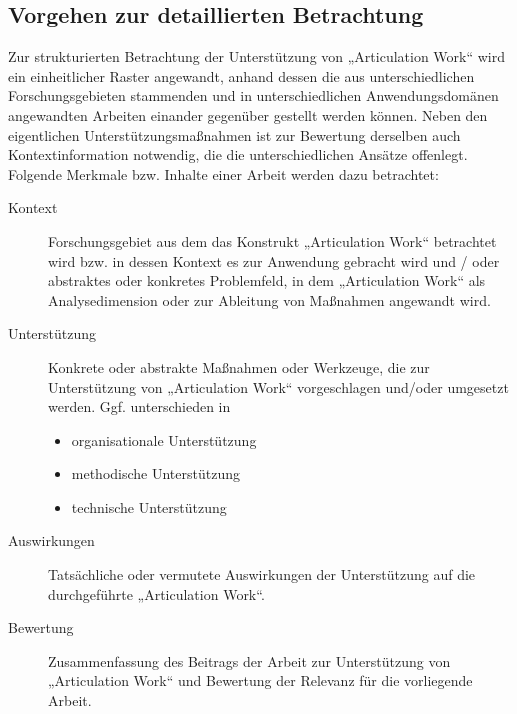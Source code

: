 \subsection{Vorgehen zur detaillierten Betrachtung} %
\label{sub:vorgehen_zur_detaillierten_betrachtung}

Zur strukturierten Betrachtung der Unterstützung von „Articulation Work“ wird ein einheitlicher Raster angewandt, anhand dessen die aus unterschiedlichen Forschungsgebieten stammenden und in unterschiedlichen Anwendungsdomänen angewandten Arbeiten einander gegenüber gestellt werden können. Neben den eigentlichen Unterstützungsmaßnahmen ist zur Bewertung derselben auch Kontextinformation notwendig, die die unterschiedlichen Ansätze offenlegt. Folgende Merkmale bzw. Inhalte einer Arbeit werden dazu betrachtet:

\begin{description}
	\item[Kontext] Forschungsgebiet aus dem das Konstrukt „Articulation Work“ betrachtet wird bzw. in dessen Kontext es zur Anwendung gebracht wird und / oder abstraktes oder konkretes Problemfeld, in dem „Articulation Work“ als Analysedimension oder zur Ableitung von Maßnahmen angewandt wird.
	\item[Unterstützung] Konkrete oder abstrakte Maßnahmen oder Werkzeuge, die zur Unterstützung von „Articulation Work“ vorgeschlagen und/oder umgesetzt werden. Ggf. unterschieden in
	\begin{itemize}
		\item organisationale Unterstützung
		\item methodische Unterstützung
		\item technische Unterstützung
	\end{itemize}
	\item[Auswirkungen] Tatsächliche oder vermutete Auswirkungen der Unterstützung auf die durchgeführte „Articulation Work“.
	\item[Bewertung] Zusammenfassung des Beitrags der Arbeit zur Unterstützung von „Articulation Work“ und Bewertung der Relevanz für die vorliegende Arbeit.
\end{description}

